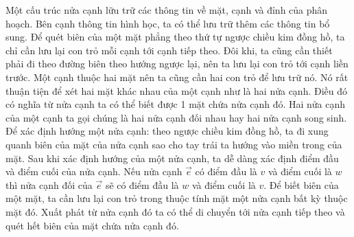 \documentclass[15pt]{article}
\begin{document}
{Một cấu trúc nửa cạnh lữu trữ các thông tin về mặt, cạnh và đỉnh của phân hoạch. Bên cạnh thông tin hình học, ta có thể lưu trữ thêm các thông tin bổ sung. Để quét biên của một mặt phẳng theo thứ tự ngược chiều kim đồng hồ, ta chỉ cần lưu lại con trỏ mỗi cạnh tới cạnh tiếp theo. Đôi khi, ta cũng cần thiết phải đi theo đường biên theo hướng ngược lại, nên ta lưu lại con trỏ tới cạnh liền trước. Một cạnh thuộc hai mặt nên ta cũng cần hai con trỏ để lưu trữ nó. Nó rất thuận tiện để xét hai mặt khác nhau của một cạnh như là hai nửa cạnh. Điều đó có nghĩa từ nửa cạnh ta có thể biết được 1 mặt chứa nửa cạnh đó. Hai nửa cạnh của một cạnh ta gọi chúng là hai nửa cạnh đối nhau hay hai nửa cạnh song sinh. Để xác định hướng một nửa cạnh: theo ngược chiều kim đồng hồ, ta đi xung quanh biên của mặt của nửa cạnh sao cho tay trái ta hướng vào miền trong của mặt. Sau khi xác định hướng của một nửa cạnh, ta dễ dàng xác định điểm đầu và điểm cuối của nửa cạnh. Nếu nửa cạnh $\vec{e}$ có điểm đầu là $v$ và điểm cuối là $w$ thì nửa cạnh đối của $\vec{e}$ sẽ có điểm đầu là $w$ và điểm cuối là $v$. Để biết biên của một mặt, ta cần lưu lại con trỏ trong thuộc tính mặt một nửa cạnh bất kỳ thuộc mặt đó. Xuất phát từ nửa cạnh đó ta có thể di chuyển tới nửa cạnh tiếp theo và quét hết biên của mặt chứa nửa cạnh đó. \\

}
\end{document}
